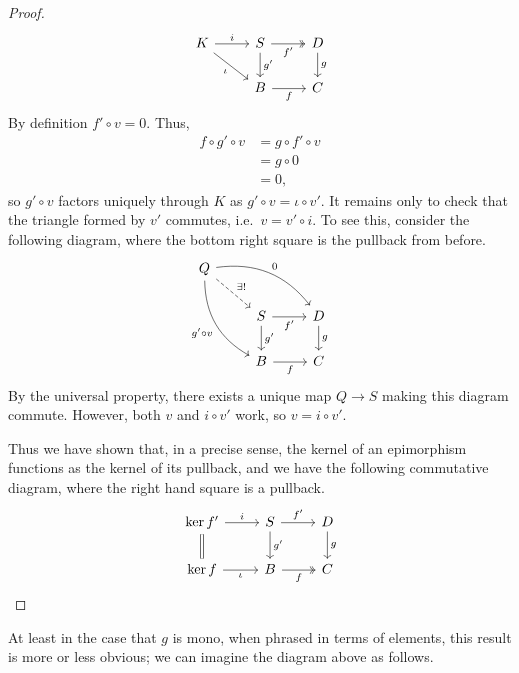 \documentclass[main.tex]{subfiles}
\begin{document}
\begin{proof}
\begin{equation*}
\begin{tikzcd}
      K
      \arrow[r, "i"]
      \arrow[dr, swap, "\iota"]
      & S
      \arrow[r, twoheadrightarrow, swap, "f'"]
      \arrow[d, "g'"]
      & D
      \arrow[d, "g"]
      \\
      & B
      \arrow[r, swap, "f"]
      & C
    \end{tikzcd}
  \end{equation*}
  By definition $f' \circ v = 0$. Thus,
  \begin{align*}
    f \circ g' \circ v &= g \circ f' \circ v \\
    &= g \circ 0 \\
    &= 0,
  \end{align*}
  so $g' \circ v$ factors uniquely through $K$ as $g' \circ v = \iota \circ v'$. It remains only to check that the triangle formed by $v'$ commutes, i.e.\ $v = v' \circ i$. To see this, consider the following diagram, where the bottom right square is the pullback from before.
  \begin{equation*}
    \begin{tikzcd}
      Q
      \arrow[drr, bend left, "0"]
      \arrow[ddr, bend right, swap, "g' \circ v"]
      \arrow[dr, dashed, "\exists!"]
      \\
      & S
      \arrow[r, swap, "f'"]
      \arrow[d, "g'"]
      & D
      \arrow[d, "g"]
      \\
      & B
      \arrow[r, swap, "f"]
      & C
    \end{tikzcd}
  \end{equation*}
  By the universal property, there exists a unique map $Q \to S$ making this diagram commute. However, both $v$ and $i \circ v'$ work, so $v = i \circ v'$.

  Thus we have shown that, in a precise sense, the kernel of an epimorphism functions as the kernel of its pullback, and we have the following commutative diagram, where the right hand square is a pullback.
  \begin{equation*}
    \begin{tikzcd}
      \ker f'
      \arrow[d, equals]
      \arrow[r, "i"]
      & S
      \arrow[r, "f'"]
      \arrow[d, "g'"]
      & D
      \arrow[d, "g"]
      \\
      \ker f
      \arrow[r, swap, "\iota"]
      & B
      \arrow[r, twoheadrightarrow, swap, "f"]
      & C
    \end{tikzcd}
  \end{equation*}
\end{proof}
At least in the case that $g$ is mono, when phrased in terms of elements, this result is more or less obvious; we can imagine the diagram above as follows.
\end{document}
